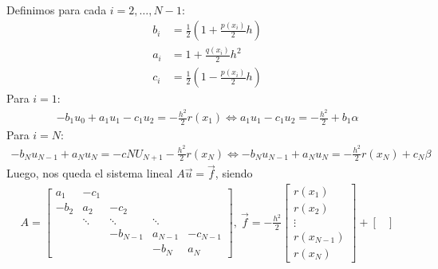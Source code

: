 \begin{ejemplo}
\begin{align*}
    \end{align*}
    Definimos para cada $i = 2,\ldots,N-1$:
    \begin{align*}
        b_i & = \frac{1}{2}\left(1 + \frac{p(x_i)}{2}h \right) \\
        a_i & = 1 + \frac{q(x_i)}{2}h^2                        \\
        c_i & = \frac{1}{2}\left(1 - \frac{p(x_i)}{2}h \right)
    \end{align*}
    Para $i = 1$:
    \begin{align*}
        -b_1u_0 + a_1u_1 - c_1u_2 = -\frac{h^2}{2}r(x_1) \Longleftrightarrow a_1u_1 - c_1u_2 = -\frac{h^2}{2} + b_1\alpha
    \end{align*}
    Para $i = N$:
    \begin{align*}
        -b_Nu_{N-1} + a_Nu_N = -cNU_{N+1}-\frac{h^2}{2}r(x_N) \Longleftrightarrow -b_Nu_{N-1} + a_Nu_N = -\frac{h^2}{2}r(x_N) + c_N\beta
    \end{align*}
    Luego, nos queda el sistema lineal $A \overrightarrow{u} = \overrightarrow{f}$, siendo
    \begin{align*}
        A = \begin{bmatrix}
                a_1  & -c_1   &          &         &          \\
                -b_2 & a_2    & -c_2     &         &          \\
                     & \ddots & \ddots   & \ddots  &          \\
                     &        & -b_{N-1} & a_{N-1} & -c_{N-1} \\
                     &        &          & -b_N    & a_N
            \end{bmatrix}, \ \overrightarrow{f} = -\frac{h^2}{2} \begin{bmatrix}
                                                                     r(x_1)     \\
                                                                     r(x_2)     \\
                                                                     \vdots     \\
                                                                     r(x_{N-1}) \\
                                                                     r(x_N)
                                                                 \end{bmatrix} + \begin{bmatrix}

\end{bmatrix}
\end{align*}
\end{ejemplo}
